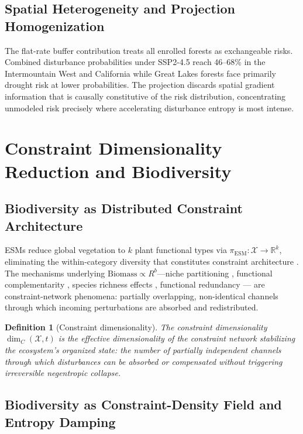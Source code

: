 \documentclass[12pt]{article}
\newtheorem{definition}{Definition}
\newcommand{\Xcal}{\mathcal{X}}
\newcommand{\R}{\mathbb{R}}
\begin{document}
\subsection{Spatial Heterogeneity and Projection Homogenization}

The flat-rate buffer contribution treats all enrolled forests as exchangeable risks.
Combined disturbance probabilities under SSP2-4.5 reach 46--68\% in the Intermountain
West and California while Great Lakes forests face primarily drought risk at lower
probabilities. The projection discards spatial gradient information that is causally
constitutive of the risk distribution, concentrating unmodeled risk precisely where
accelerating disturbance entropy is most intense.

\section{Constraint Dimensionality Reduction and Biodiversity}

\subsection{Biodiversity as Distributed Constraint Architecture}

ESMs reduce global vegetation to $k$ plant functional types via $\pi_\text{ESM}:\Xcal\to\R^k$,
eliminating the within-category diversity that constitutes constraint architecture
\citep{Juarrero1999}. The mechanisms underlying $\text{Biomass}\propto R^b$---niche
partitioning \citep{Tilman1997,Loreau2001}, functional complementarity \citep{Hooper2005},
species richness effects \citep{Cardinale2012}, functional redundancy \citep{Reich2012,Duffy2017}---
are constraint-network phenomena: partially overlapping, non-identical channels through
which incoming perturbations are absorbed and redistributed.

\begin{definition}[Constraint dimensionality]
The \emph{constraint dimensionality} $\dim_C(\Xcal,t)$ is the effective dimensionality
of the constraint network stabilizing the ecosystem's organized state: the number of
partially independent channels through which disturbances can be absorbed or compensated
without triggering irreversible negentropic collapse.
\end{definition}

\subsection{Biodiversity as Constraint-Density Field and Entropy Damping}
\end{document}
